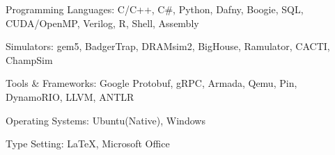 \documentclass[a4paper,9pt,oneside]{article}
\begin{document}
\begin{body}
\BulletItem
Programming Languages:
C/C++,
C\#,
Python,
Dafny,
Boogie,
SQL,
CUDA/OpenMP,
Verilog,
R,
Shell,
Assembly

\BulletItem
Simulators:
gem5,
BadgerTrap,
DRAMsim2,
BigHouse,
Ramulator,
CACTI,
ChampSim

\BulletItem
Tools \& Frameworks:
Google Protobuf,
gRPC,
Armada,
Qemu,
Pin,
DynamoRIO,
LLVM,
ANTLR

\BulletItem
Operating Systems:
Ubuntu(Native),
Windows

\BulletItem
Type Setting:
{\LaTeX},
Microsoft Office















\end{body}

\end{document}
